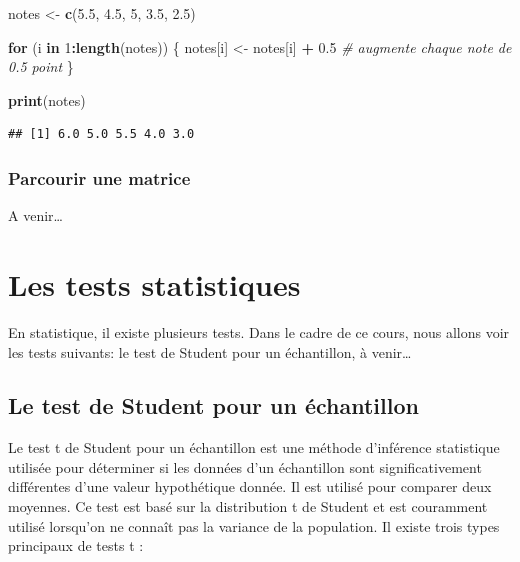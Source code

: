 \documentclass[
]{book}
\newenvironment{Shaded}{\begin{snugshade}}{\end{snugshade}}
\newcommand{\CommentTok}[1]{\textcolor[rgb]{0.56,0.35,0.01}{\textit{#1}}}
\newcommand{\ControlFlowTok}[1]{\textcolor[rgb]{0.13,0.29,0.53}{\textbf{#1}}}
\newcommand{\DecValTok}[1]{\textcolor[rgb]{0.00,0.00,0.81}{#1}}
\newcommand{\FloatTok}[1]{\textcolor[rgb]{0.00,0.00,0.81}{#1}}
\newcommand{\FunctionTok}[1]{\textcolor[rgb]{0.13,0.29,0.53}{\textbf{#1}}}
\newcommand{\NormalTok}[1]{#1}
\newcommand{\OtherTok}[1]{\textcolor[rgb]{0.56,0.35,0.01}{#1}}
\newcommand{\SpecialCharTok}[1]{\textcolor[rgb]{0.81,0.36,0.00}{\textbf{#1}}}
\begin{document}
\begin{Shaded}
\begin{Highlighting}[]
\NormalTok{notes }\OtherTok{\textless{}{-}} \FunctionTok{c}\NormalTok{(}\FloatTok{5.5}\NormalTok{, }\FloatTok{4.5}\NormalTok{, }\DecValTok{5}\NormalTok{, }\FloatTok{3.5}\NormalTok{, }\FloatTok{2.5}\NormalTok{)}

\ControlFlowTok{for}\NormalTok{ (i }\ControlFlowTok{in} \DecValTok{1}\SpecialCharTok{:}\FunctionTok{length}\NormalTok{(notes)) \{}
\NormalTok{  notes[i] }\OtherTok{\textless{}{-}}\NormalTok{ notes[i] }\SpecialCharTok{+} \FloatTok{0.5}  \CommentTok{\# augmente chaque note de 0.5 point}
\NormalTok{\}}

\FunctionTok{print}\NormalTok{(notes)}
\end{Highlighting}
\end{Shaded}

\begin{verbatim}
## [1] 6.0 5.0 5.5 4.0 3.0
\end{verbatim}

\subsection{Parcourir une matrice}\label{parcourir-une-matrice}

A venir\ldots{}

\chapter{Les tests statistiques}\label{les-tests-statistiques}

En statistique, il existe plusieurs tests. Dans le cadre de ce cours, nous allons voir les tests suivants: le test de Student pour un échantillon, à venir\ldots{}

\section{Le test de Student pour un échantillon}\label{le-test-de-student-pour-un-uxe9chantillon}

Le test t de Student pour un échantillon est une méthode d'inférence statistique utilisée pour déterminer si les données d'un échantillon sont significativement différentes d'une valeur hypothétique donnée. Il est utilisé pour comparer deux moyennes. Ce test est basé sur la distribution t de Student et est couramment utilisé lorsqu'on ne connaît pas la variance de la population. Il existe trois types principaux de tests t :
\end{document}
